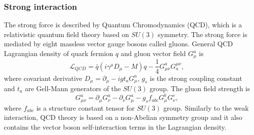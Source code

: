 \subsubsection{Strong interaction}
\label{sec:QCD_SM}
The strong force is described by Quantum Chromodynamics (QCD), which is a relativistic quantum field theory based on $SU(3)$ symmetry.
The strong force is mediated by eight massless vector gauge bosons called gluons. 
General QCD Lagrangian density of quark fermion $q$ and gluon vector field $G^a_\mu$ is
\begin{equation}
	\mathcal{L}_{QCD}=\bar{q}(i\gamma^\mu D_\mu - M ) q - \frac{1}{4}G^a_{\mu\nu}G^{\mu\nu}_a,
    \label{formula:strongLagrangian_1}
\end{equation}
where covariant derivative $D_\mu = \partial_\mu - i g t_a G^a_\mu$, $g_s$ is the strong coupling constant and $t_a$ are Gell-Mann generators of the $SU(3)$ group. The gluon field strength is
\begin{equation}
G^a_{\mu\nu}=\partial_\mu G^a_\nu - \partial_\nu G^a_\mu - g_s f_{abc}G_\mu^b G_\nu^c,
\end{equation}
where $f_{abc}$ is a structure constant tensor for $SU(3)$ group. 
Similarly to the weak interaction, QCD theory is based on a non-Abelian symmetry group and it also contains the vector boson self-interaction terms in the Lagrangian density. 

